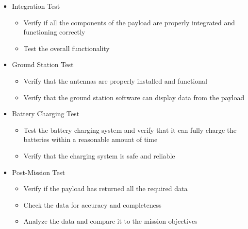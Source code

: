 \begin{itemize}[leftmargin=1cm, itemindent=0.25cm, noitemsep, topsep=0pt, label=]
\item Integration Test
\begin{itemize}[label=, noitemsep, topsep=2pt]
\item Verify if all the components of the payload are properly integrated and functioning correctly
\item Test the overall functionality
\end{itemize}

\item Ground Station Test
\begin{itemize}[label=, noitemsep, topsep=2pt]
\item Verify that the antennas are properly installed and functional
\item Verify that the ground station software can display data from the payload
\end{itemize}

\item Battery Charging Test
\begin{itemize}[label=, noitemsep, topsep=2pt]
\item Test the battery charging system and verify that it can fully charge the batteries within a reasonable amount of time
\item Verify that the charging system is safe and reliable
\end{itemize}

\item Post-Mission Test
\begin{itemize}[label=, noitemsep, topsep=2pt]
\item Verify if the payload has returned all the required data
\item Check the data for accuracy and completeness
\item Analyze the data and compare it to the mission objectives
\end{itemize}

\end{itemize}